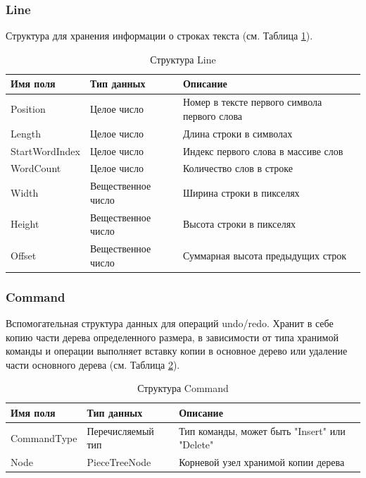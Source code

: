 \documentclass{fefu}
\begin{document}
			\subsubsection{Line}
				\par Структура для хранения информации о строках текста (см. Таблица 
				\ref{table:Line}).
				\begin{table}[H]
					\centering
					\begin{tabular}{|l|l|p{9cm}|}
						\hline
						\textbf{Имя поля} & \textbf{Тип данных} & \textbf{Описание} \\
						\hline
						Position & Целое число & Номер в тексте первого символа первого слова 
						\\
						\hline
						Length  & Целое число & Длина строки в символах \\
						\hline
						StartWordIndex & Целое число & Индекс первого слова в массиве слов \\
						\hline
						WordCount & Целое число & Количество слов в строке \\
						\hline
						Width & Вещественное число & Ширина строки в пикселях \\
						\hline
						Height & Вещественное число & Высота строки в пикселях \\
						\hline
						Offset & Вещественное число & Суммарная высота предыдущих строк \\
						\hline
					\end{tabular}
					\caption{Структура Line}
					\label{table:Line}
				\end{table}
			\subsubsection{Command}
				\par Вспомогательная структура данных для операций undo/redo. Хранит в себе
				копию части дерева определенного размера, в зависимости от типа хранимой
				команды и операции выполняет вставку копии в основное дерево или удаление
				части основного дерева (см. Таблица \ref{table:Command}).
				\begin{table}[h]
					\centering
					\begin{tabular}{|l|l|p{9cm}|}
						\hline
						\textbf{Имя поля} & \textbf{Тип данных} & \textbf{Описание} \\
						\hline
						CommandType & Перечисляемый тип & Тип команды, может быть "Insert" или 
						"Delete" \\
						\hline
						Node & PieceTreeNode & Корневой узел хранимой копии дерева \\
						\hline
					\end{tabular}
					\caption{Структура Command}
					\label{table:Command}
				\end{table}
\end{document}
